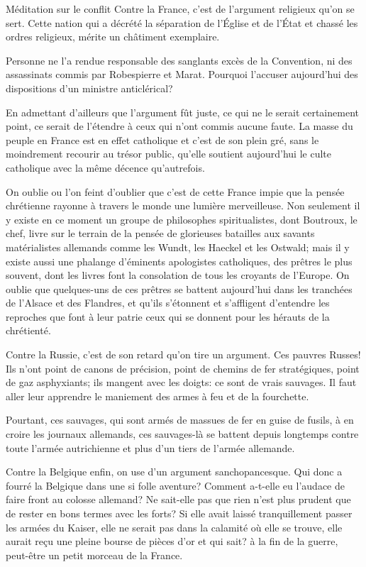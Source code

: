 \begin{chapter}{Méditation sur le conflit}
Contre la France, c'est de l'argument religieux qu'on se sert. Cette
nation qui a décrété la séparation de l'Église et de l'État et chassé
les ordres religieux, mérite un châtiment exemplaire.

Personne ne l'a rendue responsable des sanglants excès de la Convention,
ni des assassinats commis par Robespierre et Marat. Pourquoi l'accuser
aujourd'hui des dispositions d'un ministre anticlérical?

En admettant d'ailleurs que l'argument fût juste, ce qui ne le serait
certainement point, ce serait de l'étendre à ceux qui n'ont commis
aucune faute. La masse du peuple en France est en effet catholique et
c'est de son plein gré, sans le moindrement recourir au trésor public,
qu'elle soutient aujourd'hui le culte catholique avec la même décence
qu'autrefois.

On oublie ou l'on feint d'oublier que c'est de cette France impie que la
pensée chrétienne rayonne à travers le monde une lumière merveilleuse.
Non seulement il y existe en ce moment un groupe de philosophes
spiritualistes, dont Boutroux, le chef, livre sur le terrain de la
pensée de glorieuses batailles aux savants matérialistes allemands comme
les Wundt, les Haeckel et les Ostwald; mais il y existe aussi une
phalange d'éminents apologistes catholiques, des prêtres le plus
souvent, dont les livres font la consolation de tous les croyants de
l'Europe. On oublie que quelques-uns de ces prêtres se battent
aujourd'hui dans les tranchées de l'Alsace et des Flandres, et qu'ils
s'étonnent et s'affligent d'entendre les reproches que font à leur
patrie ceux qui se donnent pour les hérauts de la chrétienté.

Contre la Russie, c'est de son retard qu'on tire un argument. Ces
pauvres Russes! Ils n'ont point de canons de précision, point de chemins
de fer stratégiques, point de gaz asphyxiants; ils mangent avec les
doigts: ce sont de vrais sauvages. Il faut aller leur apprendre le
maniement des armes à feu et de la fourchette.

Pourtant, ces sauvages, qui sont armés de massues de fer en guise de
fusils, à en croire les journaux allemands, ces sauvages-là se battent
depuis longtemps contre toute l'armée autrichienne et plus d'un tiers de
l'armée allemande.

Contre la Belgique enfin, on use d'un argument sanchopancesque. Qui donc
a fourré la Belgique dans une si folle aventure? Comment a-t-elle eu
l'audace de faire front au colosse allemand? Ne sait-elle pas que rien
n'est plus prudent que de rester en bons termes avec les forts? Si elle
avait laissé tranquillement passer les armées du Kaiser, elle ne serait
pas dans la calamité où elle se trouve, elle aurait reçu une pleine
bourse de pièces d'or et qui sait? à la fin de la guerre, peut-être un
petit morceau de la France.


\end{chapter}
